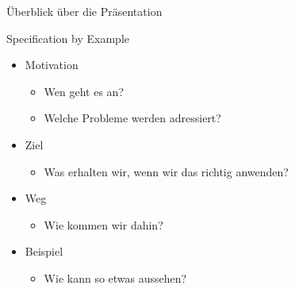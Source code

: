 \begin{frame}{Überblick über die Präsentation}

\Large{Specification by Example}

\vspace{2em}

\begin{itemize}

	\item Motivation
	\begin{itemize}
		\item Wen geht es an?
		\item Welche Probleme werden adressiert?
	\end{itemize}


	\item Ziel
	\begin{itemize}
		\item Was erhalten wir, wenn wir das richtig anwenden?
	\end{itemize}

	\item Weg
	\begin{itemize}
		\item Wie kommen wir dahin?
	\end{itemize}

	\item Beispiel
	\begin{itemize}
		\item Wie kann so etwas aussehen?
	\end{itemize}
\end{itemize}

\end{frame}


